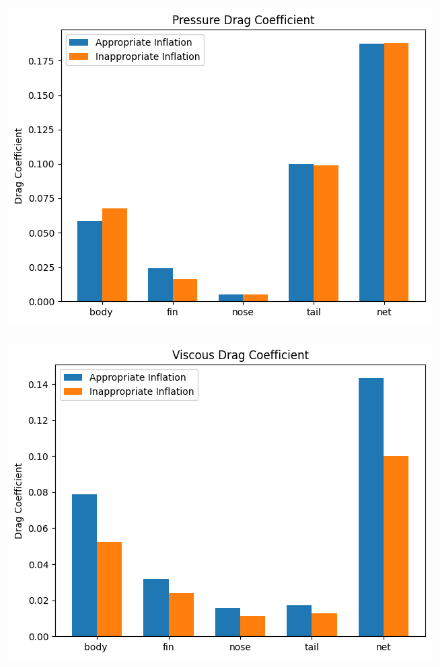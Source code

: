 \documentclass[uplatex,dvipdfmx,a4j,12pt]{jsarticle}
\begin{document}
\begin{figure}[H]
  \centering
  \begin{minipage}{0.45\linewidth}
      \centering
      \includegraphics[width=\linewidth]{wall_function/img/4_2_2_pressure_drag.png}
      \label{fig:4_2_2_cd_pressure}
  \end{minipage}
  \begin{minipage}{0.45\linewidth}
      \centering
      \includegraphics[width=\linewidth]{wall_function/img/4_2_2_viscous_drag.png}
      \label{fig:4_2_2_cd_viscous}
  \end{minipage}
  \begin{minipage}{0.45\linewidth}

\end{minipage}
\end{figure}
\end{document}
